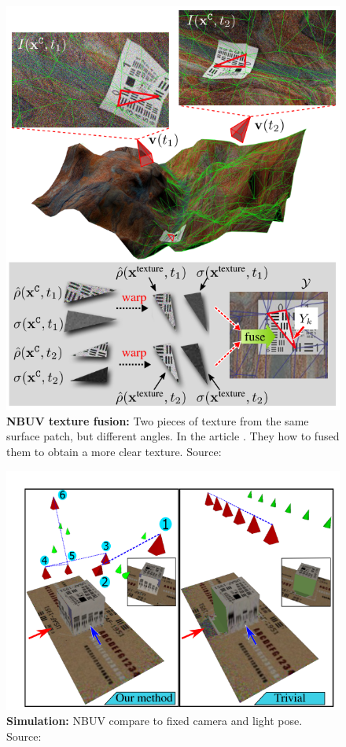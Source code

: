 \documentclass{article}
\begin{document}
\begin{figure}[h!]
\centering
\includegraphics[width=\textwidth]{NBUV_texture_fusion.png}
\caption{\textbf{NBUV texture fusion:} Two pieces of texture from the same surface patch, but different angles. In the article \cite{sheinin2016next}. They how to fused them to obtain a more clear texture. Source: \cite{sheinin2016next}}
\label{fig:NBUV_txture}
\end{figure}

\begin{figure}[h!]
\centering
\includegraphics[width=\textwidth]{NBUV_simulation.png}
\caption{\textbf{Simulation:} NBUV compare to fixed camera and light pose. Source: \cite{sheinin2016next}}
\label{fig:simulation}
\end{figure}
\end{document}

